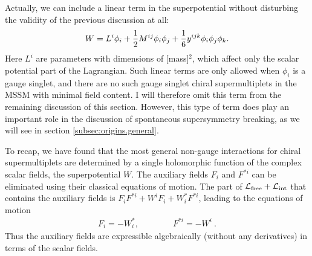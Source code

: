 \documentclass[12pt]{article}
\def\beq{\begin{eqnarray}}
\def\eeq{\end{eqnarray}}
\def\lagr{{\cal L}}
\begin{document}
Actually, we can include a linear term in the superpotential without
disturbing the validity of the previous discussion at all: 
\beq
W = L^i \phi_i +
{1\over 2} M^{ij} \phi_i \phi_j + {1\over 6} y^{ijk} \phi_i \phi_j \phi_k
.
\label{superpotentialwithlinear}
\eeq
Here $L^i$ are parameters with dimensions of [mass]$^2$, which affect only
the scalar potential part of the Lagrangian. Such
linear terms are only allowed when $\phi_i$ is a gauge singlet, and there are
no such gauge singlet chiral supermultiplets in the MSSM with minimal
field content.  I will therefore omit this term from the remaining
discussion of this section.  However, this type of term does play an
important role in the discussion of spontaneous supersymmetry breaking, as
we will see in section \ref{subsec:origins.general}. 

To recap, we have found that the most general non-gauge interactions for
chiral supermultiplets are determined by a single holomorphic function of the
complex scalar fields, the superpotential $W$. The auxiliary fields $F_i$
and $F^{*i}$ can be eliminated using their classical equations of motion.
The part of $\lagr_{\rm free} + \lagr_{\rm int}$ that contains the
auxiliary fields is $ F_i F^{*i} + W^i F_{i} + W^{*}_i F^{*i}$, leading to
the equations of motion
\beq
F_i = -W_i^*,\qquad\qquad F^{*i} = -W^i \> .
\label{replaceF}
\eeq
Thus the auxiliary fields are expressible algebraically (without any
derivatives) in terms of the scalar fields. 
\end{document}
